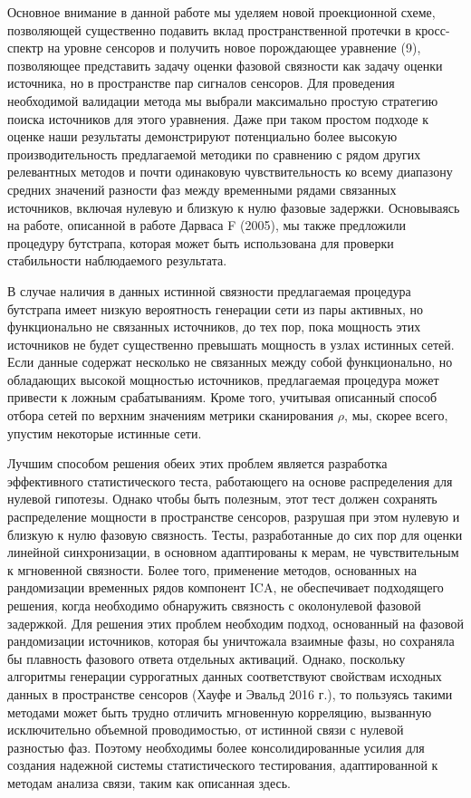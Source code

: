 Основное внимание в данной работе мы уделяем новой проекционной схеме,
позволяющей существенно подавить вклад пространственной протечки в кросс-спектр на уровне сенсоров
и получить новое порождающее уравнение (9), позволяющее представить задачу
оценки фазовой связности как задачу оценки источника, но в пространстве пар
сигналов сенсоров. Для проведения необходимой валидации метода мы
выбрали максимально простую стратегию поиска источников для этого уравнения.
Даже при таком простом подходе к оценке наши результаты демонстрируют потенциально
более высокую производительность предлагаемой методики по сравнению с рядом
других релевантных методов и почти одинаковую чувствительность ко всему
диапазону средних значений разности фаз между временными рядами связанных
источников, включая нулевую и близкую к нулю фазовые задержки. Основываясь на
работе, описанной в работе Дарваса F (2005), мы также предложили процедуру
бутстрапа, которая может быть использована для проверки стабильности
наблюдаемого результата.

В случае наличия в данных истинной связности предлагаемая процедура бутстрапа 
имеет низкую вероятность генерации сети из пары активных, но функционально
не связанных источников, до тех пор, пока мощность этих источников
не будет существенно превышать мощность в узлах истинных сетей.
Если данные содержат несколько не связанных между собой функционально, но обладающих высокой мощностью
источников, предлагаемая процедура может привести к ложным срабатываниям. Кроме
того, учитывая описанный способ отбора сетей по верхним значениям метрики
сканирования $\rho$, мы, скорее всего, упустим некоторые истинные сети.

Лучшим способом решения обеих этих проблем является разработка эффективного
статистического теста, работающего на основе распределения для нулевой гипотезы.
Однако чтобы быть полезным, этот тест должен сохранять распределение мощности
в пространстве сенсоров, разрушая при этом нулевую и близкую к нулю
фазовую связность. Тесты, разработанные до сих пор для оценки линейной
синхронизации, в основном адаптированы к мерам, не чувствительным к мгновенной
связности. Более того, применение методов, основанных на рандомизации временных
рядов компонент ICA, не обеспечивает подходящего решения, когда необходимо
обнаружить связность с околонулевой фазовой задержкой. Для решения этих проблем необходим
подход, основанный на фазовой рандомизации источников,
которая бы уничтожала взаимные фазы, но сохраняла бы плавность фазового ответа
отдельных активаций. Однако, поскольку алгоритмы генерации суррогатных данных
соответствуют свойствам исходных данных в пространстве сенсоров (Хауфе и Эвальд 2016 г.),
то пользуясь такими методами может быть трудно отличить мгновенную корреляцию,
вызванную исключительно объемной проводимостью, от истинной связи с нулевой разностью фаз.
Поэтому необходимы более консолидированные усилия для создания надежной системы
статистического тестирования, адаптированной к методам анализа связи, таким как
описанная здесь.

